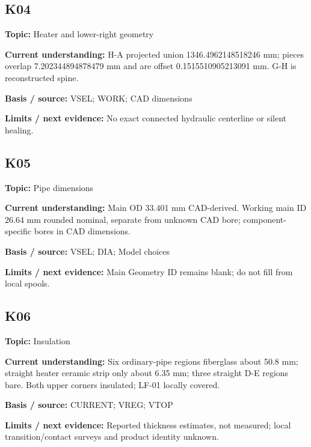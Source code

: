 \documentclass[11pt]{article}
\begin{document}
\par\noindent\begin{minipage}{\textwidth}\small\setlength{\parskip}{2pt}
\subsection*{K04}
\textbf{Topic:} Heater and lower-right geometry\par
\textbf{Current understanding:} H-A projected union 1346.4962148518246 mm; pieces overlap 7.202344894878479 mm and are offset 0.1515510905213091 mm. G-H is reconstructed spine.\par
\textbf{Basis / source:} VSEL; WORK; CAD dimensions\par
\textbf{Limits / next evidence:} No exact connected hydraulic centerline or silent healing.\par
\end{minipage}\par\vspace{5pt}
\par\noindent\begin{minipage}{\textwidth}\small\setlength{\parskip}{2pt}
\subsection*{K05}
\textbf{Topic:} Pipe dimensions\par
\textbf{Current understanding:} Main OD 33.401 mm CAD-derived. Working main ID 26.64 mm rounded nominal, separate from unknown CAD bore; component-specific bores in CAD dimensions.\par
\textbf{Basis / source:} VSEL; DIA; Model choices\par
\textbf{Limits / next evidence:} Main Geometry ID remains blank; do not fill from local spools.\par
\end{minipage}\par\vspace{5pt}
\par\noindent\begin{minipage}{\textwidth}\small\setlength{\parskip}{2pt}
\subsection*{K06}
\textbf{Topic:} Insulation\par
\textbf{Current understanding:} Six ordinary-pipe regions fiberglass about 50.8 mm; straight heater ceramic strip only about 6.35 mm; three straight D-E regions bare. Both upper corners insulated; LF-01 locally covered.\par
\textbf{Basis / source:} CURRENT; VREG; VTOP\par
\textbf{Limits / next evidence:} Reported thickness estimates, not measured; local transition/contact surveys and product identity unknown.\par
\end{minipage}\par\vspace{5pt}
\end{document}
